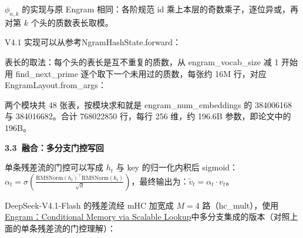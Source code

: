 \documentclass[zihao=false,fontset=windows]{ctexart}
\newcommand{\incode}[1]{\colorbox{inlinebg}{\ttfamily\small #1}}
\begin{document}
$\phi_{n,k}$ 的实现与原 Engram 相同：各阶规范 id 乘上本层的奇数乘子，逐位异或，再对第 $k$ 个头的质数表长取模。\par

V4.1 实现可以从参考\incode{NgramHashState.forward}：\par


表长的取法：每个头的表长是互不重复的质数，从 \incode{engram\_vocab\_size} 减 1 开始用 \incode{find\_next\_prime} 逐个取下一个未用过的质数，每张约 16M 行，对应 \incode{EngramLayout.from\_args}：\par


两个模块共 48 张表，按模块求和就是 \incode{engram\_num\_embeddings} 的 384006168 与 384016682。合计 768022850 行，每行 256 维，约 196.6B 参数，即论文中的 196B。\par

\par{}\vspace{0.8em}\noindent \begin{tcolorbox}[boxrule=0pt,arc=3pt,colback=callOrange,left=3pt,right=3pt,top=2pt,bottom=2pt,before skip=0pt,after skip=0pt]{\bfseries \textcolor{feishuBlue}{3.3}\ 融合：多分支门控写回}\end{tcolorbox}\par\vspace{0.28em}

\begin{feishuquote}

单条残差流的门控可以写成 $h_t$ 与 key 的归一化内积后 sigmoid：$\alpha_t=\sigma\left(\frac{\mathrm{RMSNorm}(h_t)^\top\mathrm{RMSNorm}(k_t)}{\sqrt{d}}\right)$，最终输出为：$\tilde{v}_t=\alpha_t\cdot v_t$。\par
\end{feishuquote}

DeepSeek-V4.1-Flash 的残差流经 mHC 加宽成 $M=4$ 路（\incode{hc\_mult}），使用 \href{https://scnajei2ds6y.feishu.cn/wiki/JwXTw0oUeimyoBk2QIgcSfBfn9g}{Engram：Conditional Memory via Scalable Lookup}中多分支集成的版本（对照上面的单条残差流的门控理解）：\par
\end{document}
